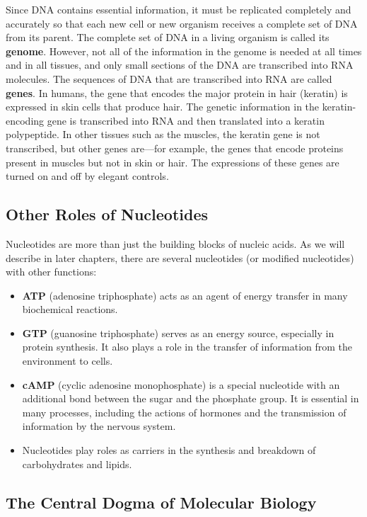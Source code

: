 \documentclass{report}
\begin{document}
Since DNA contains essential information, it must be replicated completely and accurately so that each new cell or new organism receives a complete set of DNA from its parent. The complete set of DNA in a living organism is called its \textbf{genome}. However, not all of the information in the genome is needed at all times and in all tissues, and only small sections of the DNA are transcribed into RNA molecules. The sequences of DNA that are transcribed into RNA are called \textbf{genes}. In humans, the gene that encodes the major protein in hair (keratin) is expressed in skin cells that produce hair. The genetic information in the keratin-encoding gene is transcribed into RNA and then translated into a keratin polypeptide. In other tissues such as the muscles, the keratin gene is not transcribed, but other genes are---for example, the genes that encode proteins present in muscles but not in skin or hair. The expressions of these genes are turned on and off by elegant controls.

\subsection{Other Roles of Nucleotides}

Nucleotides are more than just the building blocks of nucleic acids. As we will describe in later chapters, there are several nucleotides (or modified nucleotides) with other functions:

\begin{itemize}
    \item \textbf{ATP} (adenosine triphosphate) acts as an agent of energy transfer in many biochemical reactions.
    \item \textbf{GTP} (guanosine triphosphate) serves as an energy source, especially in protein synthesis. It also plays a role in the transfer of information from the environment to cells.
    \item \textbf{cAMP} (cyclic adenosine monophosphate) is a special nucleotide with an additional bond between the sugar and the phosphate group. It is essential in many processes, including the actions of hormones and the transmission of information by the nervous system.
    \item Nucleotides play roles as carriers in the synthesis and breakdown of carbohydrates and lipids.
\end{itemize}

\subsection{The Central Dogma of Molecular Biology}
\end{document}
